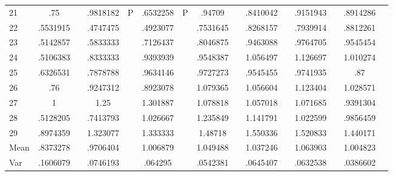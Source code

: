 \documentclass[a4paper,12pt]{article}
\begin{document}
\begin{landscape}
\begin{footnotesize}
\begin{center}
\begin{longtable}{l|cc|cc|cc|cc|cc|cc|cc|}
21&.75&&.9818182&P&.6532258&P&.94709&&.8410042&&.9151943&&.8914286& \\
22&.5531915&&.4747475&&.4923077&&.7531645&&.8268157&&.7939914&&.8812261& \\
23&.5142857&&.5833333&&.7126437&&.8046875&&.9463088&&.9764705&&.9545454& \\
24&.5106383&&.8333333&&.9393939&&.9548387&&1.056497&&1.126697&&1.010274& \\
25&.6326531&&.7878788&&.9634146&&.9727273&&.9545455&&.9741935&&.87& \\
26&.76&&.9247312&&.8923078&&1.079365&&1.056604&&1.123404&&1.028571& \\
27&1&&1.25&&1.301887&&1.078818&&1.057018&&1.071685&&.9391304& \\
28&.5128205&&.7413793&&1.026667&&1.235849&&1.141791&&1.022599&&.9856459& \\
29&.8974359&&1.323077&&1.333333&&1.48718&&1.550336&&1.520833&&1.440171& \\ \hline
Mean&.8373278&&.9706404&&1.006879&&1.049488&&1.037246&&1.063903&&1.004823& \\
Var&.1606079&&.0746193&&.064295&&.0542381&&.0645407&&.0632538&&.0386602& \\ \hline
\end{longtable}
\end{center}
\end{footnotesize}
\end{landscape}
\end{document}
